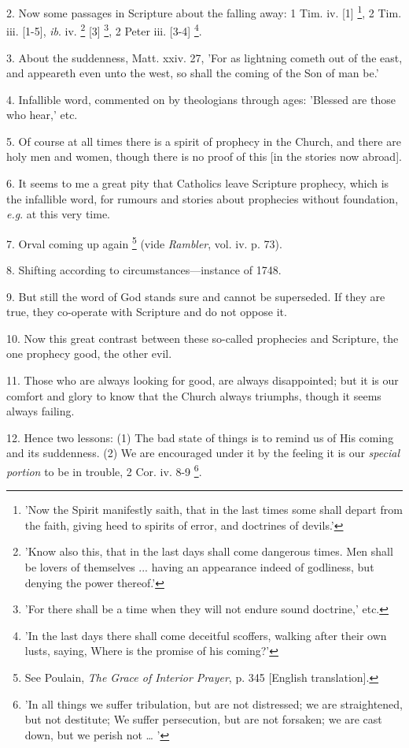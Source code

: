 2. Now some passages in Scripture about the
falling away: 1 Tim. iv. [1] \footnote{'Now the Spirit
manifestly saith, that in the last times some shall depart from the
faith, giving heed to spirits of error, and doctrines of devils.'}, 2 Tim. iii. [1-5], \emph{ib}. iv. \footnote{'Know also this, that in
the last days shall come dangerous times. Men shall be lovers of
themselves ... having an appearance indeed of godliness, but denying
the power thereof.'} [3] \footnote{'For there shall be a
time when they will not endure sound doctrine,' etc.}, 2 Peter
iii. [3-4] \footnote{'In the last days there
shall come deceitful scoffers, walking after their own lusts, saying,
Where is the promise of his coming?'}.

3. About the suddenness, Matt. xxiv. 27, 'For as
lightning cometh out of the east, and appeareth even unto the
west, so shall the coming of the Son of man be.'

4. Infallible word, commented on by theologians
through ages: 'Blessed are those who hear,' etc.

5. Of course at all times there is a spirit of
prophecy in the Church, and there are holy men and women, though there
is no proof of this [in the stories now abroad].

6. It seems to me a great pity that Catholics
leave Scripture prophecy, which is the infallible word, for rumours
and stories about prophecies without foundation, \emph{e.g}. at this
very time.

7. Orval coming up again \footnote{See Poulain, \emph{The
Grace of Interior Prayer}, p. 345 [English translation].} (vide \emph{Rambler}, vol. iv. p. 73).

8. Shifting according to circumstances—instance
of 1748.

9. But still the word of God stands sure and
cannot be superseded. If they are true, they co-operate with Scripture
and do not oppose it.

10. Now this great contrast between these
so-called prophecies and Scripture, the one prophecy good, the other
evil.

11. Those who are always looking for good, are
always disappointed; but it is our comfort and glory to know that the
Church always triumphs, though it seems always failing.

12. Hence two lessons: (1) The bad state of
things is to remind us of His coming and its suddenness. (2) We are
encouraged under it by the feeling it is our \emph{special portion} to
be in trouble, 2 Cor. iv. 8-9 \footnote{'In all things we suffer
tribulation, but are not distressed; we are straightened, but not
destitute; We suffer persecution, but are not forsaken; we are cast
down, but we perish not … '}.


